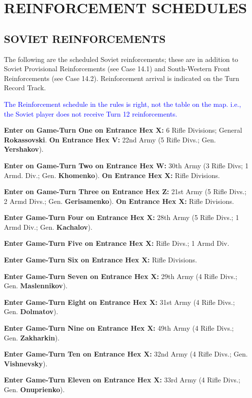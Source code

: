 \section{REINFORCEMENT SCHEDULES}

\subsection{SOVIET REINFORCEMENTS}

The following are the scheduled Soviet reinforcements; these are in addition to Soviet Provisional Reinforcements (see Case 14.1) and South-Western Front Reinforcements (see Case 14.2). Reinforcement arrival is indicated on the Turn Record Track.

\textcolor{blue}{The Reinforcement schedule in the rules is right, not the table on the map. i.e., the Soviet player does not receive Turn 12 reinforcements.}

\begin{flushleft}
  \textbf{Enter on Game-Turn One on Entrance Hex X:}
  6 Rifle Divisions; General \textbf{Rokassovski}.
  \break
  \textbf{On Entrance Hex V:}
  \break
  22nd Army (5 Rifle Divs.; Gen. \textbf{Yershakov}).

  \textbf{Enter on Game-Turn Two on Entrance Hex W:}
  30th Army (3 Rifle Divs; 1 Armd. Div.; Gen. \textbf{Khomenko}).
  \break
  \textbf{On Entrance Hex X:}
   Rifle Divisions.

  \textbf{Enter on Game-Turn Three on Entrance Hex Z:}
  21st Army (5 Rifle Divs.; 2 Armd Divs.; Gen. \textbf{Gerisamenko}).
  \break
  \textbf{On Entrance Hex X:}
   Rifle Divisions.

  \textbf{Enter Game-Turn Four on Entrance Hex X:}
  28th Army (5 Rifle Divs.; 1 Armd Div.; Gen. \textbf{Kachalov}).

  \textbf{Enter Game-Turn Five on Entrance Hex X:}
   Rifle Divs.; 1 Armd Div.

  \textbf{Enter Game-Turn Six on Entrance Hex X:}
   Rifle Divisions.

  \textbf{Enter Game-Turn Seven on Entrance Hex X:}
  \break
  29th Army (4 Rifle Divs.; Gen. \textbf{Maslennikov}).

  \textbf{Enter Game-Turn Eight on Entrance Hex X:}
  \break
  31st Army (4 Rifle Divs.; Gen. \textbf{Dolmatov}).

  \textbf{Enter Game-Turn Nine on Entrance Hex X:}
  \break
  49th Army (4 Rifle Divs.; Gen. \textbf{Zakharkin}).

  \textbf{Enter Game-Turn Ten on Entrance Hex X:}
  \break
  32nd Army (4 Rifle Divs.; Gen. \textbf{Vishnevsky}).

  \textbf{Enter Game-Turn Eleven on Entrance Hex X:}
  \break
  33rd Army (4 Rifle Divs.; Gen. \textbf{Onuprienko}).
\end{flushleft}

